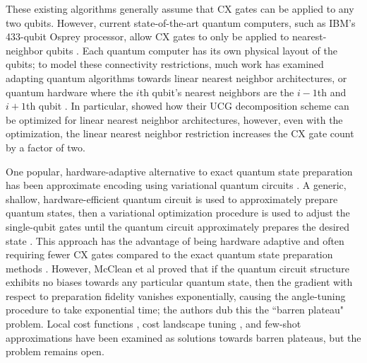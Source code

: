 \documentclass{article}
\begin{document}
These existing algorithms generally assume that CX gates can be applied to any
two qubits. However, current state-of-the-art quantum computers, such as IBM's
433-qubit Osprey processor, allow CX gates to only be applied to
nearest-neighbor qubits \cite{bravyi2022future}. Each quantum computer has its own physical layout of
the qubits; to model these connectivity restrictions, much work has examined
adapting quantum algorithms towards linear nearest neighbor architectures, or
quantum hardware where the $i$th qubit's nearest neighbors are the $i-1$th and
$i+1$th qubit \cite{1629135, bergholm2005quantum, 4782917, Saeedi_Wille_Drechsler_2010}. 
In particular, \cite{bergholm2005quantum} showed how their UCG decomposition
scheme can be optimized for linear nearest neighbor architectures, however, even
with the optimization, the linear nearest neighbor restriction increases the
CX gate count by a factor of two.

One popular, hardware-adaptive alternative to exact quantum state preparation 
has been approximate encoding using variational quantum circuits \cite{PhysRevResearch.4.023136}. A generic, 
shallow, hardware-efficient quantum circuit is used to approximately prepare 
quantum states, then a variational optimization procedure is used to adjust the
single-qubit gates until the quantum 
circuit approximately prepares the desired state \cite{PhysRevA.98.032309}. This approach has the 
advantage of being hardware adaptive and often requiring fewer CX gates compared to the 
exact quantum state preparation methods \cite{Cerezo_Sone_Volkoff_Cincio_Coles_2021}. However, McClean et al \cite{McClean_Boixo_Smelyanskiy_Babbush_Neven_2018} proved that if the 
quantum circuit structure exhibits no biases towards any particular quantum 
state, then the gradient with respect to preparation fidelity vanishes 
exponentially, causing the angle-tuning procedure to take exponential time; the
authors dub this the ``barren plateau" problem. Local cost functions \cite{Cerezo_Sone_Volkoff_Cincio_Coles_2021}, cost
landscape tuning \cite{rivera2021avoiding}, and few-shot approximations \cite{PhysRevResearch.4.023136} have been examined as solutions
towards barren plateaus, but the problem remains open.
\end{document}
